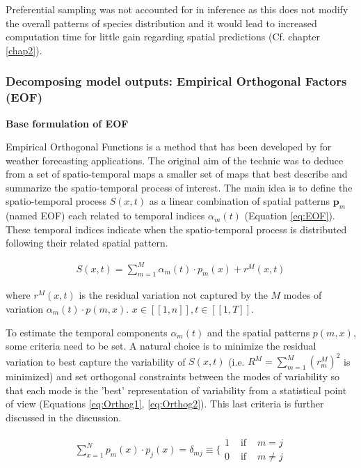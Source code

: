 Preferential sampling was not accounted for in inference as this does not modify the overall patterns of species distribution and it would lead to increased computation time for little gain regarding spatial predictions (Cf. chapter \ref{chap2}).

\newpage

\subsubsection{Decomposing model outputs: Empirical Orthogonal Factors (EOF)}

\textbf{Base formulation of EOF}

Empirical Orthogonal Functions is a method that has been developed by \textcite{lorenz1956empirical} for weather forecasting applications. The original aim of the technic was to deduce from a set of spatio-temporal maps a smaller set of maps that best describe and summarize the spatio-temporal process of interest. The main idea is to define the spatio-temporal process $S(x,t)$ as a linear combination of spatial patterns $\mathbf{p}_m$ (named EOF) each related to temporal indices $\alpha_m(t)$ (Equation \ref{eq:EOF}). These temporal indices indicate when the spatio-temporal process is distributed following their related spatial pattern.

\begin{align} \label{eq:EOF}
S(x,t)=\sum_{m=1}^M \alpha_m(t) \cdot p_m(x) + r^M(x,t)
\end{align}

where $r^M(x,t)$ is the residual variation not captured by the $M$ modes of variation $\alpha_m(t) \cdot p(m,x)$. $x\in[\![1,n]\!],t\in[\![1,T]\!]$.

To estimate the temporal components $\alpha_m(t)$ and the spatial patterns $p(m,x)$, some criteria need to be set. A natural choice is to minimize the residual variation to best capture the variability of $S(x,t)$ (i.e.  $R^M=\sum^M_{m=1}(r^M_m)^2$ is minimized) and set orthogonal constraints between the modes of variability so that each mode is the 'best' representation of variability from a statistical point of view (Equations \ref{eq:Orthog1}, \ref{eq:Orthog2}). This last criteria is further discussed in the discussion.

\begin{align}
\label{eq:Orthog1}
\sum^N_{x=1} p_m(x) \cdot p_j(x) = \delta_{mj} \equiv \Bigg \{ \begin{array}{lll}1 & \text { if } & m=j \\ 0 & \text { if } & m \neq j\end{array}
\end{align}

